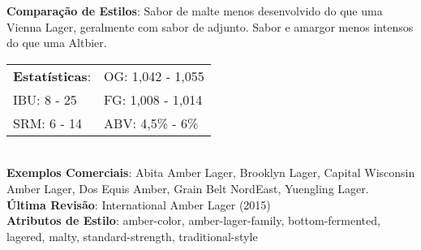 \textbf{Comparação de Estilos}: Sabor de malte menos desenvolvido do que uma Vienna Lager, geralmente com sabor de adjunto. Sabor e amargor menos intensos do que uma Altbier. \\
\begin{tabular}{@{}p{35mm}p{35mm}@{}}
  \textbf{Estatísticas}: & OG: 1,042 - 1,055 \\
  IBU: 8 - 25 & FG: 1,008 - 1,014 \\
  SRM: 6 - 14 & ABV: 4,5\% - 6\%
\end{tabular}\\
\textbf{Exemplos Comerciais}: Abita Amber Lager, Brooklyn Lager, Capital Wisconsin Amber Lager, Dos Equis Amber, Grain Belt NordEast, Yuengling Lager. \\
\textbf{Última Revisão}: International Amber Lager (2015) \\
\textbf{Atributos de Estilo}: amber-color, amber-lager-family, bottom-fermented, lagered, malty, standard-strength, traditional-style
